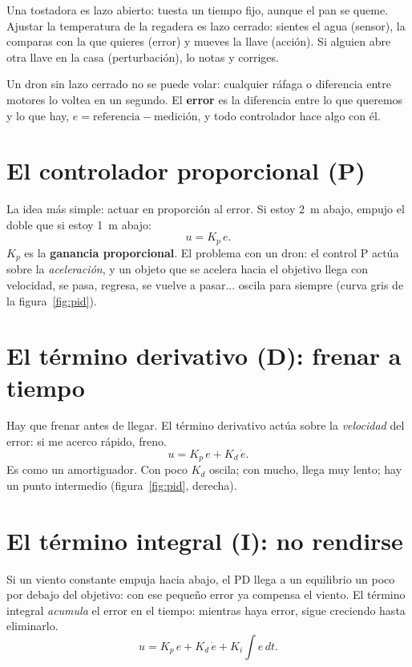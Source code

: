 \begin{ejemplo}
Una tostadora es lazo abierto: tuesta un tiempo fijo, aunque el pan se queme. Ajustar la temperatura
de la regadera es lazo cerrado: sientes el agua (sensor), la comparas con la que quieres (error) y
mueves la llave (acción). Si alguien abre otra llave en la casa (perturbación), lo notas y corriges.
\end{ejemplo}

Un dron sin lazo cerrado no se puede volar: cualquier ráfaga o diferencia entre motores lo voltea
en un segundo. El \textbf{error} es la diferencia entre lo que queremos y lo que hay,
$e = \text{referencia} - \text{medición}$, y todo controlador hace algo con él.

\section{El controlador proporcional (P)}

La idea más simple: actuar en proporción al error. Si estoy 2~m abajo, empujo el doble que si estoy
1~m abajo:
\begin{equation}
u = K_p\, e .
\end{equation}
$K_p$ es la \textbf{ganancia proporcional}. El problema con un dron: el control P actúa sobre la
\emph{aceleración}, y un objeto que se acelera hacia el objetivo llega con velocidad, se pasa,
regresa, se vuelve a pasar... oscila para siempre (curva gris de la figura~\ref{fig:pid}).

\section{El término derivativo (D): frenar a tiempo}

Hay que frenar antes de llegar. El término derivativo actúa sobre la \emph{velocidad} del error: si
me acerco rápido, freno.
\begin{equation}
u = K_p\, e + K_d\, \dot e .
\end{equation}
Es como un amortiguador. Con poco $K_d$ oscila; con mucho, llega muy lento; hay un punto intermedio
(figura~\ref{fig:pid}, derecha).

\section{El término integral (I): no rendirse}

Si un viento constante empuja hacia abajo, el PD llega a un equilibrio un poco por debajo del
objetivo: con ese pequeño error ya compensa el viento. El término integral \emph{acumula} el error en
el tiempo: mientras haya error, sigue creciendo hasta eliminarlo.
\begin{equation}
u = K_p\, e + K_d\, \dot e + K_i\!\int e\,dt .
\end{equation}

